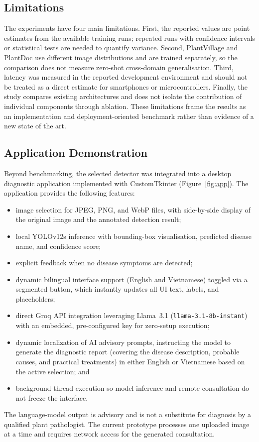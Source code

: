 \documentclass[10pt, conference]{IEEEtran}
\begin{document}
\subsection{Limitations}
\label{subsec:limitations}

The experiments have four main limitations. First, the reported values are point estimates from the available training runs; repeated runs with confidence intervals or statistical tests are needed to quantify variance. Second, PlantVillage and PlantDoc use different image distributions and are trained separately, so the comparison does not measure zero-shot cross-domain generalisation. Third, latency was measured in the reported development environment and should not be treated as a direct estimate for smartphones or microcontrollers. Finally, the study compares existing architectures and does not isolate the contribution of individual components through ablation. These limitations frame the results as an implementation and deployment-oriented benchmark rather than evidence of a new state of the art.

\subsection{Application Demonstration}
\label{subsec:application}

Beyond benchmarking, the selected detector was integrated into a desktop
diagnostic application implemented with CustomTkinter (Figure~\ref{fig:app}).
The application provides the following features:
\begin{itemize}
    \item image selection for JPEG, PNG, and WebP files, with side-by-side display
          of the original image and the annotated detection result;
    \item local YOLOv12s inference with bounding-box visualisation, predicted
          disease name, and confidence score;
    \item explicit feedback when no disease symptoms are detected;
    \item dynamic bilingual interface support (English and Vietnamese) toggled via
          a segmented button, which instantly updates all UI text, labels, and placeholders;
    \item direct Groq API integration leveraging Llama~3.1 (\texttt{llama-3.1-8b-instant})
          with an embedded, pre-configured key for zero-setup execution;
    \item dynamic localization of AI advisory prompts, instructing the model to generate
          the diagnostic report (covering the disease description, probable causes, and practical
          treatments) in either English or Vietnamese based on the active selection; and
    \item background-thread execution so model inference and remote consultation
          do not freeze the interface.
\end{itemize}
The language-model output is advisory and is not a substitute for diagnosis by a
qualified plant pathologist. The current prototype processes one uploaded image at
a time and requires network access for the generated consultation.
\end{document}
